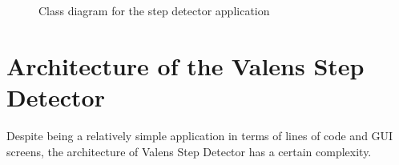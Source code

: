 \begin{figure}[p]

\caption{Class diagram for the step detector application}
\label{fig:StepDetectClassDiagram}

\setlength\fboxsep{0pt}
\setlength\fboxrule{1pt}

\end{figure}


\section{Architecture of the Valens Step Detector}

Despite being a relatively simple application in terms of lines of code and GUI screens, the architecture of Valens Step Detector has a certain complexity.

